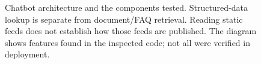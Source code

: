 \begin{figure}[t]
\caption{Chatbot architecture and the components tested.
Structured-data lookup is separate from document/FAQ retrieval. Reading static feeds does not establish how those feeds are published.
The diagram shows features found in the inspected code; not all were verified in deployment.}
\label{fig:architecture}
\end{figure}
